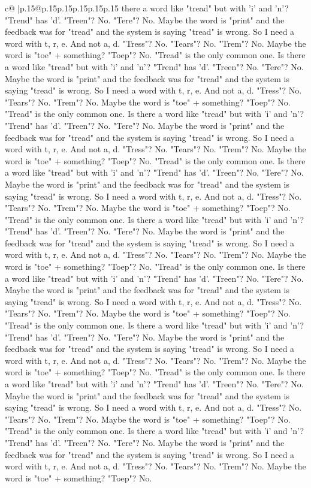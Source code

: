 \documentclass{article}
\begin{document}
{\begin{supertabular}{c@{$\;$}|p{.15\linewidth}@{}p{.15\linewidth}p{.15\linewidth}p{.15\linewidth}p{.15\linewidth}p{.15\linewidth}}
{{{there a word like "tread" but with 'i' and 'n'? "Trend" has 'd'. "Treen"? No. "Tere"? No. Maybe the word is "print" and the feedback was for "tread" and the system is saying "tread" is wrong. So I need a word with t, r, e. And not a, d. "Tress"? No. "Tears"? No. "Trem"? No. Maybe the word is "toe" + something? "Toep"? No. "Tread" is the only common one. Is there a word like "tread" but with 'i' and 'n'? "Trend" has 'd'. "Treen"? No. "Tere"? No. Maybe the word is "print" and the feedback was for "tread" and the system is saying "tread" is wrong. So I need a word with t, r, e. And not a, d. "Tress"? No. "Tears"? No. "Trem"? No. Maybe the word is "toe" + something? "Toep"? No. "Tread" is the only common one. Is there a word like "tread" but with 'i' and 'n'? "Trend" has 'd'. "Treen"? No. "Tere"? No. Maybe the word is "print" and the feedback was for "tread" and the system is saying "tread" is wrong. So I need a word with t, r, e. And not a, d. "Tress"? No. "Tears"? No. "Trem"? No. Maybe the word is "toe" + something? "Toep"? No. "Tread" is the only common one. Is there a word like "tread" but with 'i' and 'n'? "Trend" has 'd'. "Treen"? No. "Tere"? No. Maybe the word is "print" and the feedback was for "tread" and the system is saying "tread" is wrong. So I need a word with t, r, e. And not a, d. "Tress"? No. "Tears"? No. "Trem"? No. Maybe the word is "toe" + something? "Toep"? No. "Tread" is the only common one. Is there a word like "tread" but with 'i' and 'n'? "Trend" has 'd'. "Treen"? No. "Tere"? No. Maybe the word is "print" and the feedback was for "tread" and the system is saying "tread" is wrong. So I need a word with t, r, e. And not a, d. "Tress"? No. "Tears"? No. "Trem"? No. Maybe the word is "toe" + something? "Toep"? No. "Tread" is the only common one. Is there a word like "tread" but with 'i' and 'n'? "Trend" has 'd'. "Treen"? No. "Tere"? No. Maybe the word is "print" and the feedback was for "tread" and the system is saying "tread" is wrong. So I need a word with t, r, e. And not a, d. "Tress"? No. "Tears"? No. "Trem"? No. Maybe the word is "toe" + something? "Toep"? No. "Tread" is the only common one. Is there a word like "tread" but with 'i' and 'n'? "Trend" has 'd'. "Treen"? No. "Tere"? No. Maybe the word is "print" and the feedback was for "tread" and the system is saying "tread" is wrong. So I need a word with t, r, e. And not a, d. "Tress"? No. "Tears"? No. "Trem"? No. Maybe the word is "toe" + something? "Toep"? No. "Tread" is the only common one. Is there a word like "tread" but with 'i' and 'n'? "Trend" has 'd'. "Treen"? No. "Tere"? No. Maybe the word is "print" and the feedback was for "tread" and the system is saying "tread" is wrong. So I need a word with t, r, e. And not a, d. "Tress"? No. "Tears"? No. "Trem"? No. Maybe the word is "toe" + something? "Toep"? No. "Tread" is the only common one. Is there a word like "tread" but with 'i' and 'n'? "Trend" has 'd'. "Treen"? No. "Tere"? No. Maybe the word is "print" and the feedback was for "tread" and the system is saying "tread" is wrong. So I need a word with t, r, e. And not a, d. "Tress"? No. "Tears"? No. "Trem"? No. Maybe the word is "toe" + something? "Toep"? No. }}}
\end{supertabular}}
\end{document}
